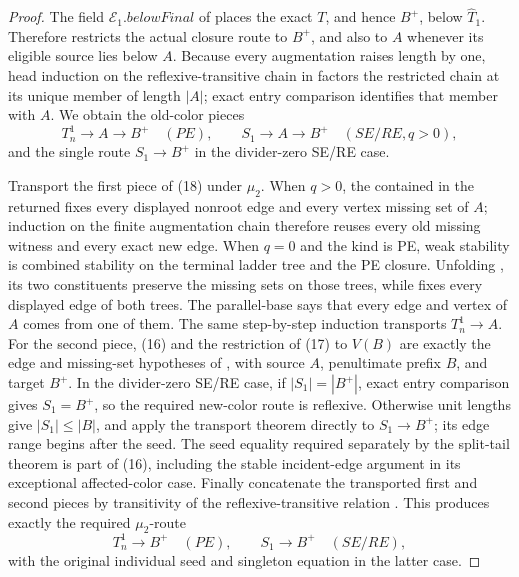 \begin{proof}
The field \(\mathcal E_1.\mathit{belowFinal}\) of
 places the exact \(T\), and hence
\(B^+\), below \(\widehat T_1\).  Therefore
 restricts the actual
closure route to \(B^+\), and also to \(A\) whenever its eligible source
lies below \(A\).  Because every augmentation raises length by one, head
induction on the reflexive-transitive chain in
 factors the restricted chain at
its unique member of length \(|A|\); exact entry comparison identifies
that member with \(A\).  We obtain the old-color pieces
\[
 T_n^1\longrightarrow A\longrightarrow B^+\quad(PE),
 \qquad
 S_1\longrightarrow A\longrightarrow B^+\quad(SE/RE, q>0),  \tag{18}
\]
and the single route \(S_1\longrightarrow B^+\) in the divider-zero
SE/RE case.

Transport the first piece of (18) under \(\mu_2\).  When \(q>0\), the
 contained in the returned
 fixes every displayed nonroot edge and
every vertex missing set of \(A\); induction on the finite augmentation
chain therefore reuses every old missing witness and every exact new edge.
When \(q=0\) and the kind is PE, weak stability is combined stability on
the terminal ladder tree and the PE closure.  Unfolding
, its two
 constituents preserve the missing sets on those
trees, while  fixes every displayed
edge of both trees.  The parallel-base  says that
every edge and vertex of \(A\) comes from one of them.  The same
step-by-step induction transports
\(T_n^1\longrightarrow A\).  For the second piece, (16) and the restriction
of (17) to \(V(B)\) are exactly the edge and missing-set hypotheses of
, with source
\(A\), penultimate prefix \(B\), and target \(B^+\).  In the divider-zero
SE/RE case, if \(|S_1|=|B^+|\), exact entry comparison gives
\(S_1=B^+\), so the required new-color route is reflexive.  Otherwise
unit lengths give \(|S_1|\leq|B|\), and apply the transport theorem
directly to \(S_1\longrightarrow B^+\); its edge range begins after the
seed.  The seed equality required separately by the split-tail theorem is
part of (16), including the stable incident-edge argument in its exceptional
affected-color case.  Finally concatenate
the transported first and second pieces by transitivity of the
reflexive-transitive relation .
This produces exactly the required \(\mu_2\)-route
\[
 T_n^1\longrightarrow B^+\quad(PE),
 \qquad S_1\longrightarrow B^+\quad(SE/RE),                   \tag{19}
\]
with the original individual seed and singleton equation in the latter
case.


\end{proof}

